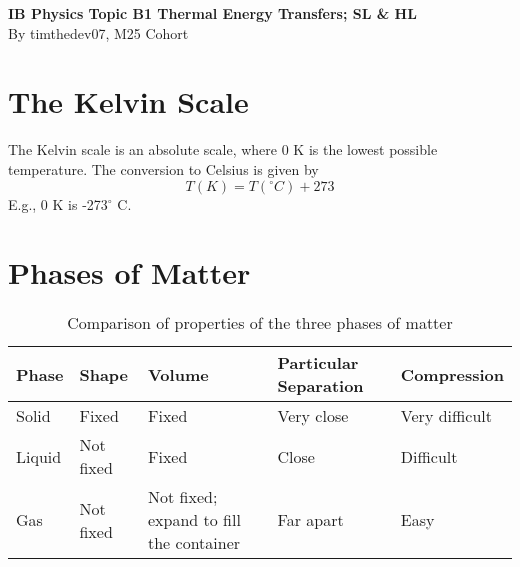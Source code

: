 \documentclass[a4paper,12pt]{article}
\let\oldsection\section
\renewcommand\section{\clearpage\oldsection}
\newcommand{\degsym}{^{\circ}}
\begin{document}
\pagestyle{fancy}


\begin{titlepage}
  \begin{center}

    \vspace*{8cm}
    \textbf{\Large {IB Physics Topic B1 Thermal Energy Transfers; SL \& HL}} \\
    \vspace*{1cm}
    \large{By timthedev07, M25 Cohort}

  \end{center}
\end{titlepage}

\pagebreak
\tableofcontents
\pagebreak

\clearpage
\setcounter{page}{1}

\section{The Kelvin Scale}

The Kelvin scale is an absolute scale, where 0 K is the lowest possible temperature. The conversion to Celsius is given by
$$T(K) = T(\degsym C) + 273$$
E.g., 0 K is -273$\degsym$ C.

\section{Phases of Matter}

\begin{table}[H]
  \centering
  \begin{tabular}{|p{}|p{}|p{}|p{}|p{}|}
    \hline
    \textbf{Phase} & \textbf{Shape} & \textbf{Volume}                         & \textbf{Particular Separation} & \textbf{Compression} \\ \hline
    Solid          & Fixed          & Fixed                                   & Very close                     & Very difficult       \\ \hline
    Liquid         & Not fixed      & Fixed                                   & Close                          & Difficult            \\ \hline
    Gas            & Not fixed      & Not fixed; expand to fill the container & Far apart                      & Easy                 \\ \hline
  \end{tabular}
  \caption{Comparison of properties of the three phases of matter}
  \label{tab:phases_of_matter}
\end{table}
\end{document}
